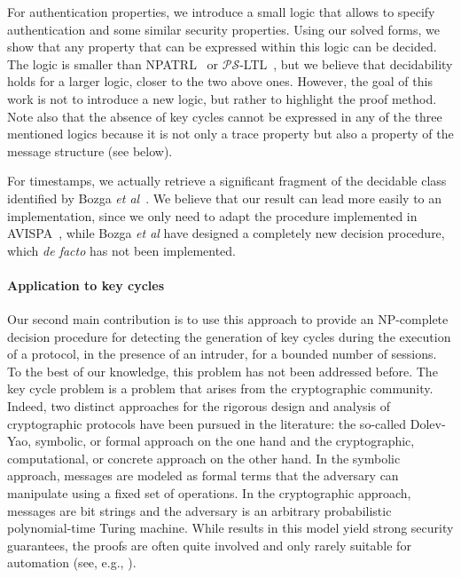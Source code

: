 \documentclass[acmtocl,acmnow]{acmtrans2m}
\newcommand{\avispa}{AVISPA}
\begin{document}
For authentication properties, we introduce a small logic that allows
to specify authentication and some similar security properties.  Using
our solved forms, we show that any property that can be
expressed within this logic can be decided.  The logic is smaller than
NPATRL~\cite{SyversonM96} or
$\mathcal{PS}$-LTL~\cite{corin-psltl,Corin-thesis}, but we believe
that decidability holds for a larger logic, closer to the two
above ones. However, the goal of this work is not to introduce a new logic,
but rather to highlight the proof method. Note also that the absence
of key cycles cannot be expressed in any of the three mentioned logics
because it is not only a trace property but also a property of the
message structure (see below).


For timestamps, we actually retrieve a significant fragment of
the decidable class identified by Bozga \textit{et al}~\cite{BEL04concur}.
We believe that our result can lead more easily to an implementation, since
we only need to adapt the procedure implemented in
\avispa~\cite{avispa2005}, while Bozga \textit{et al} have designed a
completely new decision procedure, which \textit{de facto} has not been implemented.


\paragraph{Application to key cycles} 
Our second main contribution is to use this approach to provide an
NP-complete decision procedure for detecting the generation of key
cycles during the execution of a protocol, in the presence of an
intruder, for a bounded number of sessions. To the best of our
knowledge, this problem has not been addressed before. The key cycle
problem is a problem that arises from the cryptographic community.
Indeed, two distinct approaches for the rigorous design and analysis
of cryptographic protocols have been pursued in the literature: the
so-called Dolev-Yao, symbolic, or formal approach on the one hand and
the cryptographic, computational, or concrete approach on the other
hand. In the symbolic approach, messages are modeled as formal terms
that the adversary can manipulate using a fixed set of operations. In
the cryptographic approach, messages are bit strings and the adversary
is an arbitrary probabilistic polynomial-time Turing machine. While
results in this model yield strong security guarantees, the proofs are
often quite involved and only rarely suitable for automation (see,
e.g.,
\cite{Goldwasser_Micali_JCSS84_probabilistic_encryption,BellareRogaway-CRYPTO-1993}).
\end{document}
